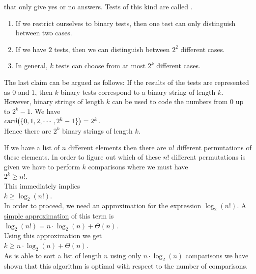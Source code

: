 that only give yes or no answers.  Tests of this kind are called .
\begin{enumerate}
\item If we restrict ourselves to binary tests, then one test can only distinguish between two cases.
\item If we have $2$ tests, then we can distinguish between  $2^2$ different cases.
\item In general, $k$ tests can choose from at most $2^k$ different cases.
\end{enumerate}
The last claim can be argued as follows:  If the results of the tests are represented as
$0$ and $1$, then $k$ binary tests correspond to a binary string of length
$k$.  However, binary strings of length $k$ can be used to code the numbers from $0$ up to
$2^{k}-1$.  We have
\\[0.2cm]
\hspace*{1.3cm}
$\textsl{card}\bigl(\{0,1,2,\cdots, 2^k-1\}\bigr) = 2^k$.
\\[0.2cm]
Hence there are $2^k$ binary strings of length $k$.  

If we have a list of $n$ different elements then there are $n!$ different permutations of these
elements.  In order to figure out which of these $n!$ different permutations is given we have to
perform $k$ comparisons where we must have
\\[0.2cm]
\hspace*{1.3cm}
$2^k \geq n!$.
\\[0.2cm]
This immediately implies
\\[0.2cm]
\hspace*{1.3cm}
$k \geq \log_2(n!)$.
\\[0.2cm]
In order to proceed, we need an approximation for the expression $\log_2(n!)$.  
A \href{http://en.wikipedia.org/wiki/Stirling's_approximation}{simple approximation} of this term is
\\[0.2cm]
\hspace*{1.3cm}
$\log_2(n!) = n \cdot \log_2(n) + \Theta(n)$.
\\[0.2cm]
Using this approximation we get
\\[0.2cm]
\hspace*{1.3cm}
$k \geq n \cdot \log_2(n) + \Theta(n)$.
\\[0.2cm]
As  is able to sort a list of length $n$ using only $n \cdot \log_2(n)$ comparisons
we have shown that this algorithm is optimal with respect to the number of comparisons.

